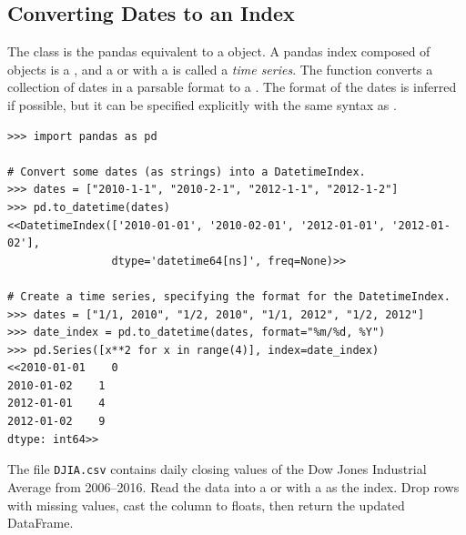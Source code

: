 \subsection*{Converting Dates to an Index} %

The  class is the pandas equivalent to a  object.
A pandas index composed of  objects is a , and a  or  with a  is called a \emph{time series}.
The function  converts a collection of dates in a parsable format to a .
The format of the dates is inferred if possible, but it can be specified explicitly with the same syntax as .

\begin{lstlisting}
>>> import pandas as pd

# Convert some dates (as strings) into a DatetimeIndex.
>>> dates = ["2010-1-1", "2010-2-1", "2012-1-1", "2012-1-2"]
>>> pd.to_datetime(dates)
<<DatetimeIndex(['2010-01-01', '2010-02-01', '2012-01-01', '2012-01-02'],
                dtype='datetime64[ns]', freq=None)>>

# Create a time series, specifying the format for the DatetimeIndex.
>>> dates = ["1/1, 2010", "1/2, 2010", "1/1, 2012", "1/2, 2012"]
>>> date_index = pd.to_datetime(dates, format="%m/%d, %Y")
>>> pd.Series([x**2 for x in range(4)], index=date_index)
<<2010-01-01    0
2010-01-02    1
2012-01-01    4
2012-01-02    9
dtype: int64>>
\end{lstlisting}

\begin{problem} %
The file \texttt{DJIA.csv} contains daily closing values of the Dow Jones Industrial Average from 2006--2016.
Read the data into a  or  with a  as the index.
Drop rows with missing values, cast the  column to floats, then return the updated DataFrame.
\label{prob:timeseries-dowjones}
\end{problem}

